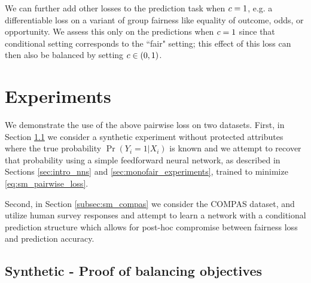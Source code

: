     We can further add other losses to the prediction task when $c = 1$, e.g. a differentiable loss on a variant of group fairness like equality of outcome, odds, or opportunity.  We assess this only on the predictions when $c = 1$ since that conditional setting corresponds to the ``fair" setting; this effect of this loss can then also be balanced by setting $c \in (0, 1)$.

\section{Experiments}\label{sec:softmono_experiments}

    We demonstrate the use of the above pairwise loss on two datasets.  First, in Section \ref{subsec:sm_synthetic} we consider a synthetic experiment without protected attributes where the true probability $\Pr(Y_i = 1 | X_i)$ is known and we attempt to recover that probability using a simple feedforward neural network, as described in Sections \ref{sec:intro_nns} and \ref{sec:monofair_experiments}, trained to minimize \ref{eq:sm_pairwise_loss}.  
    
    Second, in Section \ref{subsec:sm_compas} we consider the COMPAS dataset, and utilize human survey responses and attempt to learn a network with a conditional prediction structure which allows for post-hoc compromise between fairness loss and prediction accuracy.

    \subsection{Synthetic - Proof of balancing objectives}\label{subsec:sm_synthetic}
    
